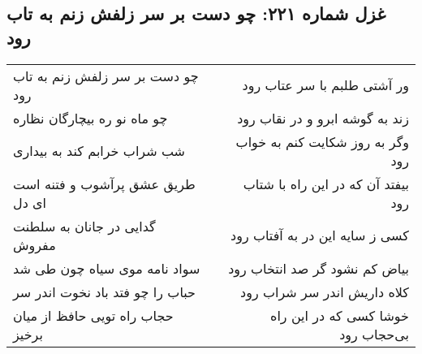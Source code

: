 \begin{center}
\section*{غزل شماره ۲۲۱: چو دست بر سر زلفش زنم به تاب رود}
\label{sec:sh221}
\begin{longtable}{l p{0.5cm} r}
چو دست بر سر زلفش زنم به تاب رود
&&
ور آشتی طلبم با سر عتاب رود
\\
چو ماه نو ره بیچارگان نظاره
&&
زند به گوشه ابرو و در نقاب رود
\\
شب شراب خرابم کند به بیداری
&&
وگر به روز شکایت کنم به خواب رود
\\
طریق عشق پرآشوب و فتنه است ای دل
&&
بیفتد آن که در این راه با شتاب رود
\\
گدایی در جانان به سلطنت مفروش
&&
کسی ز سایه این در به آفتاب رود
\\
سواد نامه موی سیاه چون طی شد
&&
بیاض کم نشود گر صد انتخاب رود
\\
حباب را چو فتد باد نخوت اندر سر
&&
کلاه داریش اندر سر شراب رود
\\
حجاب راه تویی حافظ از میان برخیز
&&
خوشا کسی که در این راه بی‌حجاب رود
\\
\end{longtable}
\end{center}
